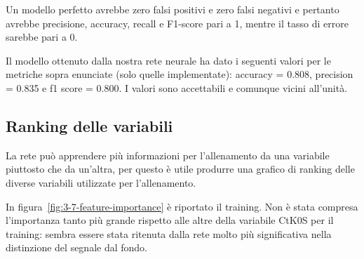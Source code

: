     Un modello perfetto avrebbe zero falsi positivi e zero falsi negativi e pertanto avrebbe precisione, accuracy, recall e F1-score pari a 1, mentre il tasso di errore sarebbe pari a 0.
    
    Il modello ottenuto dalla nostra rete neurale ha dato i seguenti valori per le metriche sopra enunciate (solo quelle implementate): accuracy  = \num{0.808}, precision = \num{0.835} e f1 score  = \num{0.800}. I valori sono accettabili e comunque vicini all'unità.

\newpage

    \subsection{Ranking delle variabili}
        La rete può apprendere più informazioni per l'allenamento da una variabile piuttosto che da un'altra, per questo è utile produrre una grafico di ranking delle diverse variabili utilizzate per l'allenamento.
        
        In figura~\ref{fig:3-7-feature-importance} è riportato il training. Non è stata compresa l'importanza tanto più grande rispetto alle altre della variabile CtK0S per il training: sembra essere stata ritenuta dalla rete molto più significativa nella distinzione del segnale dal fondo.
        
